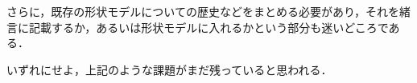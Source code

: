 \documentclass[11pt]{jsarticle}
\begin{document}
			さらに，既存の形状モデルについての歴史などをまとめる必要があり，それを緒言に記載するか，あるいは形状モデルに入れるかという部分も迷いどころである．
			
			いずれにせよ，上記のような課題がまだ残っていると思われる．
	
	\newpage
\vspace{10cm}
	

\vspace{14cm}
	\articleSPRfour
	\articleSPRfive
\end{document}
